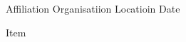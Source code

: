 

\begin{cventries}

  \cventry
  {Affiliation} %
  {Organisatiion} %
  {Locatioin} %
  {Date} %
  {
    \begin{cvitems} %
      \item {Item}
    \end{cvitems}
  }

\end{cventries}
